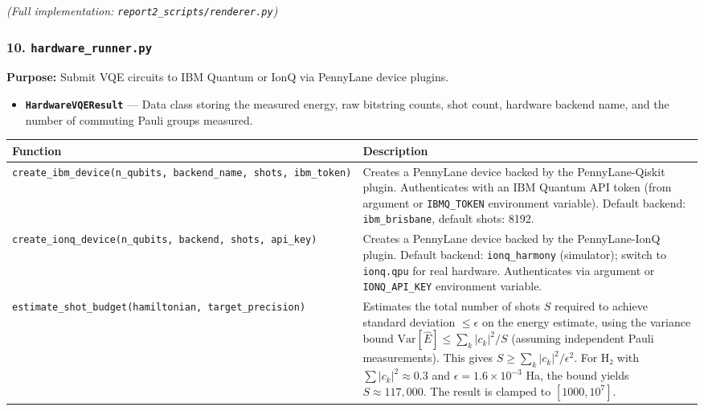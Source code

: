 \documentclass[
  11pt,
]{report}
\newcounter{none} %
\providecommand{\tightlist}{%
  \setlength{\itemsep}{0pt}\setlength{\parskip}{0pt}}
\begin{document}
\emph{(Full implementation: \texttt{report2\_scripts/renderer.py})}

\subsubsection{\texorpdfstring{10.
\texttt{hardware\_runner.py}}{10. hardware\_runner.py}}\label{hardware_runner.py}

\textbf{Purpose:} Submit VQE circuits to IBM Quantum or IonQ via
PennyLane device plugins.

\begin{itemize}
\tightlist
\item
  \textbf{\texttt{HardwareVQEResult}} --- Data class storing the
  measured energy, raw bitstring counts, shot count, hardware backend
  name, and the number of commuting Pauli groups measured.
\end{itemize}

{\def\LTcaptype{none} %
\begin{longtable}[]{@{}
  >{\raggedright\arraybackslash}p{}
  >{\raggedright\arraybackslash}p{}@{}}
\toprule\noalign{}
\begin{minipage}[b]{\linewidth}\raggedright
Function
\end{minipage} & \begin{minipage}[b]{\linewidth}\raggedright
Description
\end{minipage} \\
\midrule\noalign{}
\endhead
\bottomrule\noalign{}
\endlastfoot
\texttt{create\_ibm\_device(n\_qubits,\ backend\_name,\ shots,\ ibm\_token)}
& Creates a PennyLane device backed by the PennyLane-Qiskit plugin.
Authenticates with an IBM Quantum API token (from argument or
\texttt{IBMQ\_TOKEN} environment variable). Default backend:
\texttt{ibm\_brisbane}, default shots: 8192. \\
\texttt{create\_ionq\_device(n\_qubits,\ backend,\ shots,\ api\_key)} &
Creates a PennyLane device backed by the PennyLane-IonQ plugin. Default
backend: \texttt{ionq\_harmony} (simulator); switch to \texttt{ionq.qpu}
for real hardware. Authenticates via argument or \texttt{IONQ\_API\_KEY}
environment variable. \\
\texttt{estimate\_shot\_budget(hamiltonian,\ target\_precision)} &
Estimates the total number of shots \(S\) required to achieve standard
deviation \(\leq \epsilon\) on the energy estimate, using the variance
bound \(\text{Var}[\hat{E}] \leq \sum_k |c_k|^2 / S\) (assuming
independent Pauli measurements). This gives
\(S \geq \sum_k |c_k|^2 / \epsilon^2\). For H₂ with
\(\sum|c_k|^2 \approx 0.3\) and \(\epsilon = 1.6 \times 10^{-3}\) Ha,
the bound yields \(S \approx 117{,}000\). The result is clamped to
\([1000, 10^7]\). \\
\end{longtable}
}
\end{document}
